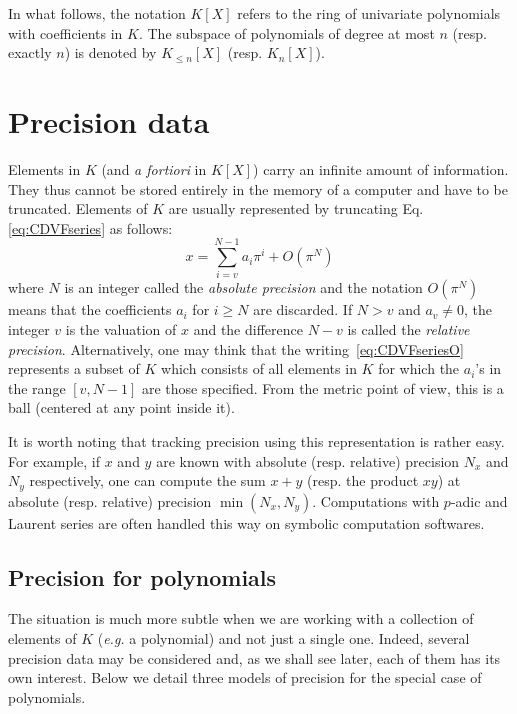 \documentclass{sig-alternate-05-2015}
\theoremstyle{definition}
\begin{document}
In what follows, the notation $K[X]$ refers to the ring of univariate 
polynomials with coefficients in $K$. The subspace of polynomials of 
degree at most $n$ (resp. exactly $n$) is denoted by $K_{\leq n}[X]$ 
(resp. $K_n[X]$).

\section{Precision data} \label{sec:prec_data}

Elements in $K$ (and \emph{a fortiori} in $K[X]$) carry an infinite 
amount of information. They thus cannot be stored entirely in the
memory of a computer and have to be truncated. Elements of $K$ are
usually represented by truncating Eq.\eqref{eq:CDVFseries} as
follows:
\begin{equation}
\label{eq:CDVFseriesO}
x = \sum_{i=v}^{N-1} a_i \pi^i + O(\pi^N)
\end{equation}
where $N$ is an integer called the \emph{absolute precision} and 
the notation $O(\pi^N)$ means that the coefficients $a_i$ for $i
\geq N$ are discarded. If $N > v$ and $a_v \neq 0$, the integer $v$ 
is the valuation of $x$ and the difference $N-v$ is called the
\emph{relative precision}.
Alternatively, one may think that the writing~\eqref{eq:CDVFseriesO}
represents a subset of $K$ which consists of all elements in $K$ for
which the $a_i$'s in the range $[v,N-1]$ are those specified. From the
metric point of view, this is a ball (centered at any point inside it).

It is worth noting that tracking precision using this representation is 
rather easy. For example, if $x$ and $y$ are known with absolute (resp. 
relative) precision $N_x$ and $N_y$ respectively, one can compute the 
sum $x+y$ (resp. the product $xy$) at absolute (resp. relative) 
precision $\min(N_x,N_y)$. Computations with $p$-adic and Laurent
series are often handled this way on symbolic computation softwares.

\subsection{Precision for polynomials}

The situation is much more subtle when we are working with a collection 
of elements of $K$ (\emph{e.g.} a polynomial) and not just a single one.
Indeed, several precision data may be considered and, as we shall see
later, each of them has its own interest. Below we detail three models 
of precision for the special case of polynomials.
\end{document}
